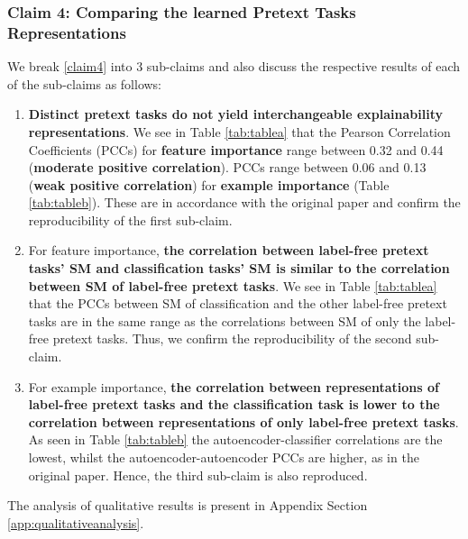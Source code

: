 \subsubsection{Claim 4: Comparing the learned Pretext Tasks Representations}\label{section:result4}
We break \ref{claim4} into 3 sub-claims and also discuss the respective results of each of the sub-claims as follows:
\begin{enumerate}[labelindent=\parindent,leftmargin=*, topsep=0pt]
    \itemsep-0.2em
\item \textbf{Distinct pretext tasks do not yield interchangeable explainability representations}. We see in Table \ref{tab:tablea} that the Pearson Correlation Coefficients (PCCs) for \textbf{feature importance} range between 0.32 and 0.44 (\textbf{moderate positive correlation}). PCCs range between 0.06 and 0.13 (\textbf{weak positive correlation}) for \textbf{example importance} (Table \ref{tab:tableb}).   These are in accordance with the original paper and confirm the reproducibility of the first sub-claim. 
\item For feature importance, \textbf{the correlation between label-free pretext tasks' SM and classification tasks' SM is similar to the correlation between SM of label-free pretext tasks}. We see in Table \ref{tab:tablea} that the PCCs between SM of classification and the other label-free pretext tasks are in the same range as the correlations between SM of only the label-free pretext tasks. Thus, we confirm the reproducibility of the second sub-claim.
\item For example importance, \textbf{the correlation  between representations of label-free pretext tasks and the classification task is lower to the correlation between representations of only label-free pretext tasks}. As seen in Table \ref{tab:tableb} the autoencoder-classifier correlations are the lowest, whilst the autoencoder-autoencoder PCCs are higher, as in the original paper.  Hence, the third sub-claim is also reproduced.
\end{enumerate}
The analysis of qualitative results is present in Appendix Section \ref{app:qualitativeanalysis}.


